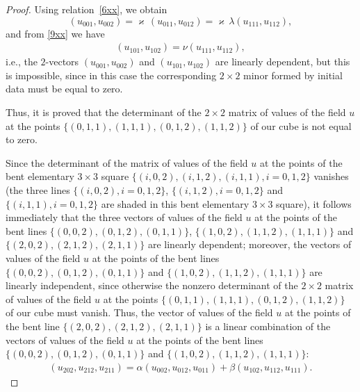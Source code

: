 \documentclass[11pt]{article}
\begin{document}
\begin{proof}
Using relation~\eqref{6xx}, we obtain \[ (u_{0 0 1}, u_{0 0 2}) =
\varkappa \, (u_{0 1 1}, u_{0 1 2}) = \varkappa \, \lambda (u_{1 1
1}, u_{1 1 2}), \] and from \eqref{9xx} we have
\begin{gather*} (u_{1 0 1},
u_{1 0 2}) = \nu (u_{1 1 1}, u_{1 1 2}), %
\end{gather*} i.e., the
$2$-vectors $(u_{0 0 1}, u_{0 0 2})$ and $(u_{1 0 1}, u_{1 0 2})$
are linearly dependent, but this is impossible, since in this case
the corresponding $2 \times 2$ minor formed by initial data must be
equal to zero.


Thus, it is proved that the determinant of the $2 \times 2$ matrix
of values of the f\/ield $u$ at the points $\{(0, 1, 1), (1, 1, 1),
(0, 1, 2), (1, 1, 2)\}$ of our cube is not equal to zero.


Since the determinant of the matrix of values of the f\/ield $u$ at
the points of the bent elementary $3 \times 3$ square $\{(i, 0, 2),
(i, 1, 2), (i, 1, 1), i = 0, 1, 2\}$ vanishes (the three lines
$\{(i, 0, 2), i = 0, 1, 2\}$, $\{(i, 1, 2), i = 0, 1, 2\}$ and
$\{(i, 1, 1), i = 0, 1, 2\}$ are shaded in this bent elementary $3
\times 3$ square), it follows immediately that the three vectors of
values of the f\/ield $u$ at the points of the bent lines $\{(0, 0,
2), (0, 1, 2), (0, 1, 1)\}$, $\{(1, 0, 2), (1, 1, 2), (1, 1, 1)\}$
and $\{(2, 0, 2), (2, 1, 2), (2, 1, 1)\}$ are linearly dependent;
moreover, the vectors of values of the f\/ield $u$ at the points of
the bent lines $\{(0, 0, 2), (0, 1, 2), (0, 1, 1)\}$ and $\{(1, 0,
2), (1, 1, 2), (1, 1, 1)\}$ are linearly independent, since
otherwise the nonzero determinant of the $2 \times 2$ matrix of
values of the f\/ield $u$ at the points $\{(0, 1, 1), (1, 1, 1), (0,
1, 2), (1, 1, 2)\}$ of our cube must vanish. Thus, the vector of
values of the f\/ield $u$ at the points of the bent line $\{(2, 0, 2),
(2, 1, 2), (2, 1, 1)\}$ is a linear combination of the vectors of
values of the f\/ield $u$ at the points of the bent lines $\{(0, 0,
2), (0, 1, 2), (0, 1, 1)\}$ and $\{(1, 0, 2), (1, 1, 2), (1, 1,
1)\}$: \begin{gather} (u_{2 0 2}, u_{2 1 2}, u_{2 1 1}) = \alpha (u_{0 0 2},
u_{0 1 2}, u_{0 1 1}) + \beta (u_{1 0 2}, u_{1 1 2}, u_{1 1 1}).
\label{7xxy} \end{gather}



\end{proof}
\end{document}
